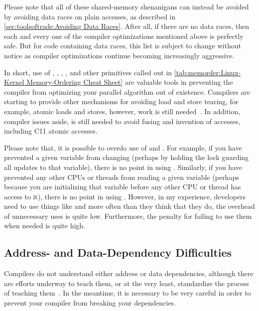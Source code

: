 Please note that all of these shared-memory shenanigans can instead be
avoided by avoiding data races on plain accesses, as described in
\cref{sec:toolsoftrade:Avoiding Data Races}.
After all, if there are no data races, then each and every one of the
compiler optimizations mentioned above is perfectly safe.
But for code containing data races, this list is subject to change
without notice as compiler optimizations continue becoming increasingly
aggressive.

In short, use of , , ,
, and other primitives called out in
\cref{tab:memorder:Linux-Kernel Memory-Ordering Cheat Sheet}
are valuable tools in preventing the compiler from
optimizing your parallel algorithm out of existence.
Compilers are starting to provide other mechanisms for avoiding
load and store tearing, for example, 
atomic loads and stores, however, work is still
needed~\cite{JonathanCorbet2016C11atomics}.
In addition, compiler issues aside,  is still needed
to avoid fusing and invention of accesses, including C11 atomic accesses.

Please note that, it is possible to overdo use of  and
.
For example, if you have prevented a given variable from changing
(perhaps by holding the lock guarding all updates to that
variable), there is no point in using .
Similarly, if you have prevented any other CPUs or threads from
reading a given variable (perhaps because you are initializing
that variable before any other CPU or thread has access to it),
there is no point in using .
However, in my experience, developers need to use things like
 and  more often than they think that
they do, the overhead of unnecessary uses is quite low.
Furthermore, the penalty for failing to use them when needed is quite high.

\subsection{Address- and Data-Dependency Difficulties}
\label{sec:memorder:Address- and Data-Dependency Difficulties}

Compilers do not understand either address or data dependencies,
although there are efforts underway to teach them, or at the very
least, standardize the process of teaching
them~\cite{PaulEMcKennneyConsumeP0190R4,PaulEMcKenney2017markconsumeP0462R1}.
In the meantime, it is necessary to be very careful in order to prevent
your compiler from breaking your dependencies.

